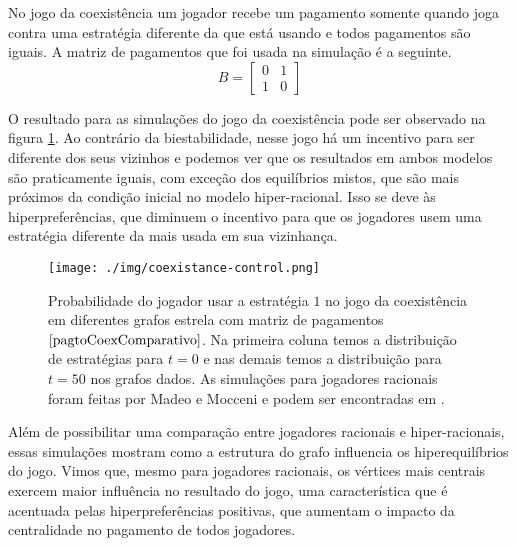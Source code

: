 No jogo da coexistência um jogador recebe um pagamento somente quando joga contra uma estratégia diferente da que está usando e todos pagamentos são iguais. A matriz de pagamentos que foi usada na simulação é a seguinte.
\begin{equation}
    \label{pagtoCoexComparativo}
    B=
    \begin{bmatrix}
        0 & 1\\ 
        1 & 0 
    \end{bmatrix}
\end{equation}

O resultado para as simulações do jogo da coexistência pode ser observado na figura \ref{fig:coex-control.png}. Ao contrário da biestabilidade, nesse jogo há um incentivo para ser diferente dos seus vizinhos e podemos ver que os resultados em ambos modelos são praticamente iguais, com exceção dos equilíbrios mistos, que são mais próximos da condição inicial no modelo hiper-racional. Isso se deve às hiperpreferências, que diminuem o incentivo para que os jogadores usem uma estratégia diferente da mais usada em sua vizinhança.

\begin{figure}[h]
    \caption{Probabilidade do jogador usar a estratégia $1$ no jogo da coexistência em diferentes grafos estrela com matriz de pagamentos $\eqref{pagtoCoexComparativo}$. Na primeira coluna temos a distribuição de estratégias para $t=0$ e nas demais temos a distribuição para $t=50$ nos grafos dados. As simulações para jogadores racionais foram feitas por Madeo e Mocceni e podem ser encontradas em \cite{madeo2015}.}
    \centerline{\texttt{[image: ./img/coexistance-control.png]}}
    \label{fig:coex-control.png}
\end{figure}

Além de possibilitar uma comparação entre jogadores racionais e hiper-racionais, essas simulações mostram como a estrutura do grafo influencia os hiperequilíbrios do jogo. Vimos que, mesmo para jogadores racionais, os vértices mais centrais exercem maior influência no resultado do jogo, uma característica que é acentuada pelas hiperpreferências positivas, que aumentam o impacto da centralidade no pagamento de todos jogadores.

